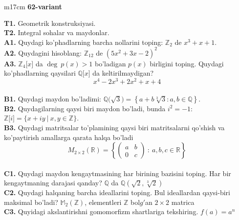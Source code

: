 \documentclass{article}
\begin{document}
\begin{tabular}{m{17cm}}
\textbf{62-variant}
\newline

\textbf{T1.} Geometrik konstruksiyasi. \\
\textbf{T2.} Integral sohalar va maydonlar. \\
\textbf{A1.} Quydagi ko'phadlarning barcha nollarini toping:
\(\mathbb{Z}_{2}\) de \(x^{3} + x + 1\). \\
\textbf{A2.} Quydagini hisoblang:
\(\mathbb{Z}_{12}\) de \(\left( 5x^{2} + 3x - 2 \right)^{2}\) \\
\textbf{A3.} \(\mathbb{Z}_{4}\lbrack x\rbrack\) da \(\deg\ p(x) > 1\) bo'ladigan \(p(x)\) birligini toping. Quydagi ko'phadlarning qaysilari \(\mathbb{Q\lbrack}x\rbrack\) da keltirilmaydigan?
\[x^{4} - 2x^{3} + 2x^{2} + x + 4\] \\
\textbf{B1.} Quydagi maydon bo'ladimi:
\(\mathbb{Q(}\sqrt{3}) = \left\{ a + b\sqrt[3]{3}:a,b \in \mathbb{Q} \right\}\). \\
\textbf{B2.} Quydagilarning qaysi biri maydon bo'ladi, bunda \(i^{2} = - 1\):
\(\mathbb{Z\lbrack}i\rbrack = \{ x + iy\ |\ x,y \in \mathbb{Z\}}\). \\
\textbf{B3.} Quydagi matritsalar to'plamining qaysi biri matritsalarni qo'shish va ko'paytirish amallarga qarata halqa bo'ladi
\[M_{2 \times 2}\mathbb{(R) =}\left\{ \begin{pmatrix}
a & b \\
0 & c
\end{pmatrix}\ :\ a,b,c \in \mathbb{R} \right\}\] \\
\textbf{C1.} Quydagi maydon kengaytmasining har birining bazisini toping. Har bir kengaytmaning darajasi qanday?
\(\mathbb{Q}\) da \(\mathbb{Q}\left( \sqrt{2},\sqrt[3]{2} \right)\) \\
\textbf{C2.} Quydagi halqaning barcha ideallarini toping. Bul ideallardan qaysi-biri maksimal bo'ladi?
\(\mathbb{M}_{2}\left( \mathbb{Z} \right)\), elementleri \(\mathbb{Z}\) bol\(g'\)an \(2 \times 2\) matrica \\
\textbf{C3.} Quyidagi akslantirishni gomomorfizm shartlariga tekshiring. \(f(a) = a^{n}\) \\

\end{tabular}
\vspace{1cm}
\end{document}
